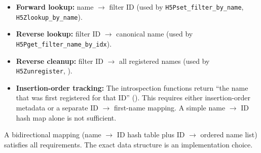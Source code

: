 \documentclass[../HDF5_RFC.tex]{subfiles}
\begin{document}
\begin{itemize}
\item \textbf{Forward lookup:} name $\rightarrow$ filter ID (used by
  \texttt{H5Pset\_filter\_by\_name}, \texttt{H5Zlookup\_by\_name}).
\item \textbf{Reverse lookup:} filter ID $\rightarrow$ canonical name (used by
  \texttt{H5Pget\_filter\_name\_by\_idx}).
\item \textbf{Reverse cleanup:} filter ID $\rightarrow$ all registered names (used by
  \texttt{H5Zunregister}, ).
\item \textbf{Insertion-order tracking:} The introspection functions return ``the
  name that was first registered for that ID''
  (). This requires either insertion-order
  metadata or a separate ID $\rightarrow$ first-name mapping. A simple
  name $\rightarrow$ ID hash map alone is not sufficient.
\end{itemize}

A bidirectional mapping (name $\rightarrow$ ID hash table plus ID $\rightarrow$ ordered name
list) satisfies all requirements. The exact data structure is an
implementation choice.
\end{document}
